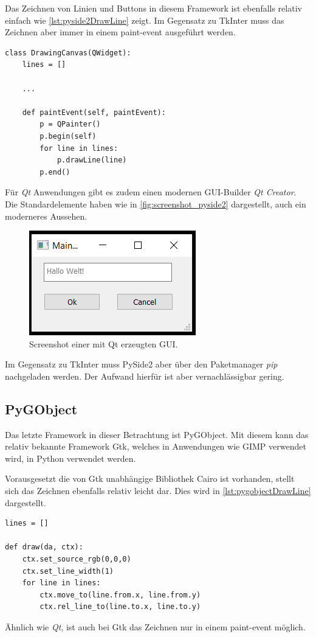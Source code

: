 Das Zeichnen von Linien und Buttons in diesem Framework ist ebenfalls relativ einfach wie \autoref{lst:pyside2DrawLine} zeigt. Im Gegensatz zu TkInter muss das Zeichnen aber immer in einem paint-event ausgeführt werden.
\begin{lstlisting}[caption={Zeichnen von Linien mit Qt},label=lst:pyside2DrawLine]
class DrawingCanvas(QWidget):
	lines = []
	
	...

	def paintEvent(self, paintEvent):
    	p = QPainter()
    	p.begin(self)
    	for line in lines:
	    	p.drawLine(line)
    	p.end()
\end{lstlisting}
Für \textit{Qt} Anwendungen gibt es zudem einen modernen \ac{GUI}-Builder \textit{Qt Creator}. Die Standardelemente haben wie in \autoref{fig:screenshot_pyside2} dargestellt, auch ein moderneres Aussehen.

\begin{figure}[h]
\begin{center}
\includegraphics[scale=0.7]{images/pyside2_screenshot.png}
\caption{Screenshot einer mit Qt erzeugten GUI.}
\label{fig:screenshot_pyside2}
\end{center}
\end{figure}

Im Gegensatz zu TkInter muss PySide2 aber über den Paketmanager \textit{pip} nachgeladen werden. Der Aufwand hierfür ist aber vernachlässigbar gering.

\subsection{PyGObject}
Das letzte Framework in dieser Betrachtung ist PyGObject. Mit diesem kann das relativ bekannte Framework Gtk, welches in Anwendungen wie GIMP verwendet wird, in Python verwendet werden.

Vorausgesetzt die von Gtk unabhängige Bibliothek Cairo ist vorhanden, stellt sich das Zeichnen ebenfalls relativ leicht dar. Dies wird in \autoref{lst:pygobjectDrawLine} dargestellt.
\begin{lstlisting}[caption={Zeichnen von Linien mit Gtk},label=lst:pygobjectDrawLine]
lines = []

def draw(da, ctx):
	ctx.set_source_rgb(0,0,0)
	ctx.set_line_width(1)
	for line in lines:
		ctx.move_to(line.from.x, line.from.y)
		ctx.rel_line_to(line.to.x, line.to.y)
\end{lstlisting}
Ähnlich wie \textit{Qt}, ist auch bei Gtk das Zeichnen nur in einem paint-event möglich.

